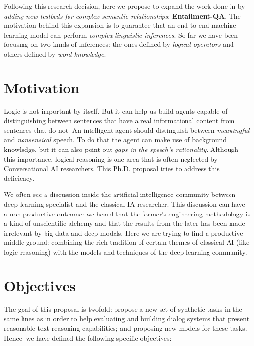 Following this research decision, here we propose to expand the work done in \cite{BordesW16, WestonBCM15} by \textit{adding new testbeds for complex semantic relationships}: \textbf{Entailment-QA}. The motivation behind this expansion is to guarantee that an end-to-end machine learning model can perform \textit{complex linguistic inferences}. So far we have been focusing on two kinds of inferences: the ones defined by \textit{logical operators} and others defined by \textit{word knowledge}.


\section{Motivation}
\label{sec:motivation}

Logic is not important by itself. But it can help us build agents capable of distinguishing between sentences that have a real informational content from sentences that do not. An intelligent agent should distinguish between \textit{meaningful} and \textit{nonsensical} speech. To do that the agent can make use of background knowledge, but it can also point out \textit{gaps in the speech's rationality}. Although this importance, logical reasoning is one area that is often neglected by Conversational AI researchers. This Ph.D. proposal tries to address this deficiency.

We often see a discussion inside the artificial intelligence community between deep learning specialist and the classical IA researcher. This discussion can have a non-productive outcome: we heard that the former's engineering methodology is a kind of unscientific alchemy and that the results from the later has been made irrelevant by big data and deep models. Here we are trying to find a productive middle ground: combining the rich tradition of certain themes of classical AI (like logic reasoning) with the models and techniques of the deep learning community.

\section{Objectives}
\label{sec:objectives}

The goal of this proposal is twofold:  propose a new set of synthetic tasks in the same lines as \cite{WestonBCM15} in order to help evaluating and building dialog systems that present reasonable text reasoning capabilities;  and proposing new models for these tasks. Hence, we have defined the following specific objectives:

